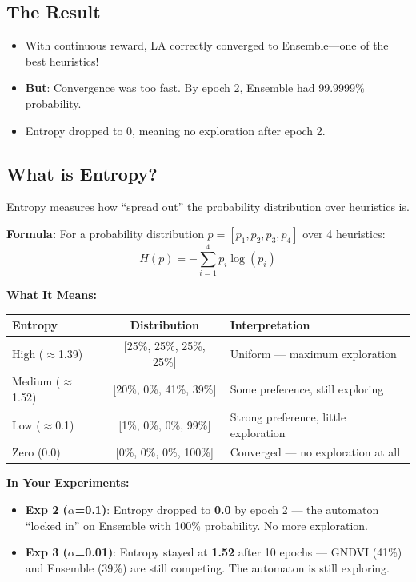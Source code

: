 \documentclass[11pt]{article}
\newenvironment{talkingpoints}{%
  \begin{itemize}[leftmargin=1.5em, itemsep=0.3em]
}{%
  \end{itemize}
}
\begin{document}
\subsection{The Result}

\begin{talkingpoints}
  \item With continuous reward, LA correctly converged to Ensemble---one of the best heuristics!
  \item \textbf{But}: Convergence was too fast. By epoch 2, Ensemble had 99.9999\% probability.
  \item Entropy dropped to 0, meaning no exploration after epoch 2.
\end{talkingpoints}

\subsection{What is Entropy?}

Entropy measures how ``spread out'' the probability distribution over heuristics is.

\textbf{Formula:} For a probability distribution $p = [p_1, p_2, p_3, p_4]$ over 4 heuristics:
\[
H(p) = -\sum_{i=1}^{4} p_i \log(p_i)
\]

\textbf{What It Means:}

\begin{center}
\begin{tabular}{lcl}
\toprule
\textbf{Entropy} & \textbf{Distribution} & \textbf{Interpretation} \\
\midrule
High ($\approx$1.39) & [25\%, 25\%, 25\%, 25\%] & Uniform --- maximum exploration \\
Medium ($\approx$1.52) & [20\%, 0\%, 41\%, 39\%] & Some preference, still exploring \\
Low ($\approx$0.1) & [1\%, 0\%, 0\%, 99\%] & Strong preference, little exploration \\
Zero (0.0) & [0\%, 0\%, 0\%, 100\%] & Converged --- no exploration at all \\
\bottomrule
\end{tabular}
\end{center}

\textbf{In Your Experiments:}
\begin{talkingpoints}
  \item \textbf{Exp 2 ($\alpha$=0.1)}: Entropy dropped to \textbf{0.0} by epoch 2 --- the automaton ``locked in'' on Ensemble with 100\% probability. No more exploration.
  \item \textbf{Exp 3 ($\alpha$=0.01)}: Entropy stayed at \textbf{1.52} after 10 epochs --- GNDVI (41\%) and Ensemble (39\%) are still competing. The automaton is still exploring.
\end{talkingpoints}
\end{document}
